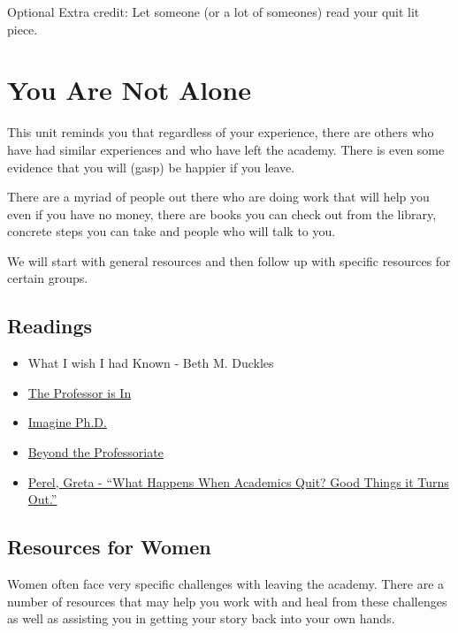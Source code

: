 \documentclass[]{book}
\providecommand{\tightlist}{%
  \setlength{\itemsep}{0pt}\setlength{\parskip}{0pt}}
\theoremstyle{definition}
\theoremstyle{definition}
\theoremstyle{definition}
\theoremstyle{remark}
\begin{document}
Optional Extra credit: Let someone (or a lot of someones) read your quit
lit piece.

\chapter{You Are Not Alone}\label{you-are-not-alone}

This unit reminds you that regardless of your experience, there are
others who have had similar experiences and who have left the academy.
There is even some evidence that you will (gasp) be happier if you
leave.

There are a myriad of people out there who are doing work that will help
you even if you have no money, there are books you can check out from
the library, concrete steps you can take and people who will talk to
you.

We will start with general resources and then follow up with specific
resources for certain groups.

\section{Readings}\label{readings-1}

\begin{itemize}
\tightlist
\item
  What I wish I had Known - Beth M. Duckles
\item
  \href{http://theprofessorisin.com/}{The Professor is In}
\item
  \href{https://www.imaginephd.com/}{Imagine Ph.D.}
\item
  \href{https://community.beyondprof.com/}{Beyond the Professoriate}
\item
  \href{https://www.timeshighereducation.com/blog/what-happens-when-academics-quit-good-things-it-turns-out}{Perel,
  Greta - ``What Happens When Academics Quit? Good Things it Turns
  Out.''}
\end{itemize}

\section{Resources for Women}\label{resources-for-women}

Women often face very specific challenges with leaving the academy.
There are a number of resources that may help you work with and heal
from these challenges as well as assisting you in getting your story
back into your own hands.
\end{document}
